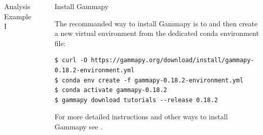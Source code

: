 \documentclass[
    final,
    ]{beamer}
\newlength{\sepwidth}
\newlength{\colwidth}
\newcommand{\separatorcolumn}{\begin{column}{\sepwidth}\end{column}}
\newcommand{\coloredhref}[3][blue]{\href{#2}{\color{#1}{#3}}}%
\begin{document}
\begin{frame}[t, fragile]
\begin{columns}[t]
\begin{column}{\colwidth}
\begin{block}{Analysis Example I}
  \end{block}

\end{column}

\separatorcolumn

\begin{column}{\colwidth}

  \begin{alertblock}{Install Gammapy}

    The recommanded way to install Gammapy is to \coloredhref[pink]{https://www.anaconda.com/products/individual}{download the Anaconda Python distribution} and then create a new virtual environment
    from the dedicated conda environment file:
%
    \begin{verbatim}
$ curl -O https://gammapy.org/download/install/gammapy-0.18.2-environment.yml
$ conda env create -f gammapy-0.18.2-environment.yml
$ conda activate gammapy-0.18.2
$ gammapy download tutorials --release 0.18.2
    \end{verbatim}
%
    \vspace{-24pt} 
    For more detailed instructions and other ways to install Gammapy see \coloredhref[pink]{https://docs.gammapy.org/0.18.2/install/index.html}{installation instructions}.
  \end{alertblock}


\end{column}
\end{columns}
\end{frame}
\end{document}
